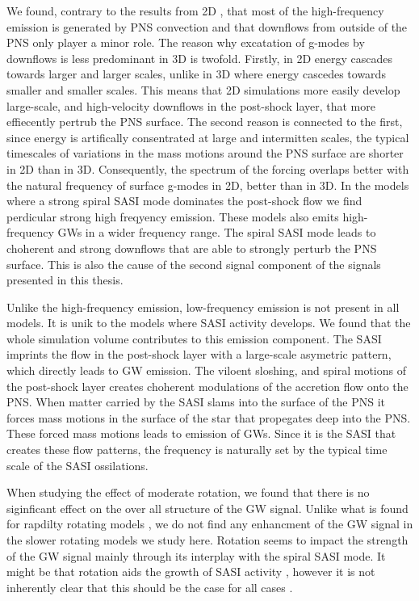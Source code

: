 We found, contrary to the results from 2D \citep{marek_08,murphy_09,mueller_13}, that most of the high-frequency emission is 
generated by PNS convection and that downflows from outside of the PNS only player a minor role. The reason why excatation 
of g-modes by downflows is less predominant in 3D is twofold. Firstly, in 2D energy cascades towards larger and larger scales, unlike
in 3D where energy cascedes towards smaller and smaller scales. This means that 2D simulations more easily develop large-scale, and
high-velocity downflows in the post-shock layer, that more effiecently pertrub the PNS surface. The second reason is connected to the first, since
energy is artifically consentrated at large and intermitten scales, the typical timescales of variations in the mass motions around 
the PNS surface are shorter in 2D than in 3D. Consequently, the spectrum of the forcing overlaps better with the natural frequency
of surface g-modes in 2D, better than in 3D.
In the models where a strong spiral SASI mode dominates the post-shock flow we find perdicular strong high freqyency emission. These models
also emits high-frequency GWs in a wider frequency range. The spiral SASI mode leads to choherent and strong downflows that are able to
strongly perturb the PNS surface. This is also the cause of the second signal component of the signals presented in this thesis.  

Unlike the high-frequency emission, low-frequency emission \citep{kuroda_16} 
is not present in all models. It is unik to the models where SASI activity develops.
We found that the whole simulation volume contributes to this emission component. The SASI imprints the flow in the post-shock layer with a
large-scale asymetric pattern, which directly leads to GW emission. The viloent sloshing, and spiral motions of the post-shock layer
creates choherent modulations of the accretion flow onto the PNS. When matter carried by the SASI slams into the surface of the PNS
it forces mass motions in the surface of the star that propegates deep into the PNS. These forced mass motions leads to emission of GWs.
Since it is the SASI that creates these flow patterns, the frequency is naturally set by the typical time scale of the SASI ossilations.

When studying the effect of moderate rotation, we found that there is no siginficant effect on the over all structure of the
GW signal. Unlike what is found for rapdilty rotating models \citep{rampp_98,shibata_05,ott_05,kuroda_14,takiwaki_16}, 
we do not find any enhancment of the GW signal in the slower rotating models we study here. Rotation seems to impact the 
strength of the GW signal mainly through its interplay with the spiral SASI mode. It might be that rotation aids
the growth of SASI activity \citep{yamasaki_08,blondin_17}, however it is not inherently clear that this should be the case
for all cases \citep{kazeroni_17}.

